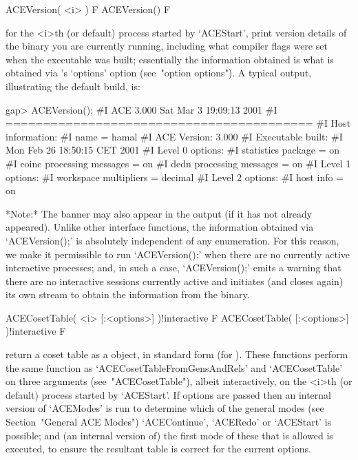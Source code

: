 \>ACEVersion( <i> ) F
\>ACEVersion() F

for the <i>th  (or  default)  process  started  by  `ACEStart',  print
version details of  the  {\ACE}  binary  you  are  currently  running,
including what compiler flags were set when the executable was  built;
essentially the information obtained is what is obtained via  {\ACE}'s
`options'   option   (see~"option   options").   A   typical   output,
illustrating the default build, is:

\beginexample
gap> ACEVersion();      
#I  ACE 3.000        Sat Mar  3 19:09:13 2001
#I  =========================================
#I  Host information:
#I    name = hamal
#I  ACE Version: 3.000
#I  Executable built:
#I    Mon Feb 26 18:50:15 CET 2001
#I  Level 0 options:
#I    statistics package = on
#I    coinc processing messages = on
#I    dedn processing messages = on
#I  Level 1 options:
#I    workspace multipliers = decimal
#I  Level 2 options:
#I    host info = on
\endexample

*Note:*
The {\ACE} banner may also appear in the output (if it has not already
appeared). Unlike other {\ACE} interface  functions,  the  information
obtained  via  `ACEVersion();'  is  absolutely  independent   of   any
enumeration.  For  this  reason,  we  make  it  permissible   to   run
`ACEVersion();' when there are no currently active interactive  {\ACE}
processes; and, in such a case, `ACEVersion();' emits a  warning  that
there  are  no  interactive  {\ACE}  sessions  currently  active   and
initiates (and closes again) its own stream to obtain the  information
from the {\ACE} binary.


\>ACECosetTable( <i> [:<options>] )!{interactive} F
\>ACECosetTable( [:<options>] )!{interactive} F

return a coset table  as  a  {\GAP}  object,  in  standard  form  (for
{\GAP}).   These   functions   perform   the    same    function    as
`ACECosetTableFromGensAndRels' and `ACECosetTable' on three  arguments
(see~"ACECosetTable"), albeit interactively, on the <i>th (or default)
process started by `ACEStart'. If options are passed then an  internal
version of `ACEModes' is run to determine which of the general  {\ACE}
modes (see Section~"General ACE Modes")  `ACEContinue',  `ACERedo'  or
`ACEStart' is possible; and (an internal version of) the first mode of
these that is allowed is executed, to ensure the  resultant  table  is
correct for the current options.

